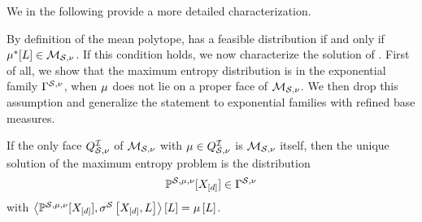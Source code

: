 We in the following provide a more detailed characterization.


By definition of the mean polytope,  has a feasible distribution if and only if $\mu^*[L]\in\mathcal{M}_{\mathcal{S},\nu}$.
If this condition holds, we now characterize the solution of .
First of all, we show that the maximum entropy distribution is in the exponential family $\Gamma^{\mathcal{S},\nu}$, when $\mu$ does not lie on a proper face of $\mathcal{M}_{\mathcal{S},\nu}$.
We then drop this assumption and generalize the statement to exponential families with refined base measures.

\begin{theorem} %
    \label{the:maxEntropyInterior}
    If the only face $Q^{\mathcal{I}}_{\mathcal{S},\nu}$ of $\mathcal{M}_{\mathcal{S},\nu}$ with $\mu\in Q^{\mathcal{I}}_{\mathcal{S},\nu}$ is $\mathcal{M}_{\mathcal{S},\nu}$ itself, then the unique solution of the maximum entropy problem  is the distribution
    \begin{align*}
        \mathbb{P}^{\mathcal{S},\mu,\nu}[X_{[d]}]\in\Gamma^{\mathcal{S},\nu}
    \end{align*}
    with $\left\langle \mathbb{P}^{\mathcal{S},\mu,\nu}[X_{[d]}],\sigma^{\mathcal{S}}\left[X_{[d]},L\right]\right\rangle \left[ L \right]=\mu\left[L\right]$.
\end{theorem}

